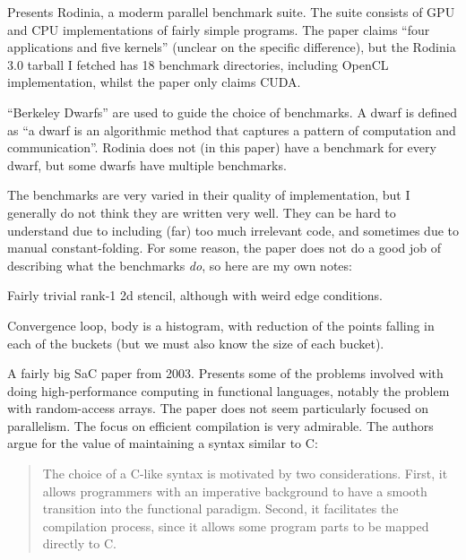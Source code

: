\documentclass[a4paper, oneside, final]{memoir}
\begin{document}
\begin{quote}
\end{quote}

Presents Rodinia, a moderm parallel benchmark suite.  The suite
consists of GPU and CPU implementations of fairly simple programs.
The paper claims ``four applications and five kernels'' (unclear on
the specific difference), but the Rodinia 3.0 tarball I fetched has 18
benchmark directories, including OpenCL implementation, whilst the
paper only claims CUDA.

``Berkeley Dwarfs'' are used to guide the choice of benchmarks.  A
dwarf is defined as ``a dwarf is an algorithmic method that captures a
pattern of computation and communication''.  Rodinia does not (in this
paper) have a benchmark for every dwarf, but some dwarfs have multiple
benchmarks.

The benchmarks are very varied in their quality of implementation, but
I generally do not think they are written very well.  They can be hard
to understand due to including (far) too much irrelevant code, and
sometimes due to manual constant-folding.  For some reason, the paper
does not do a good job of describing what the benchmarks \textit{do},
so here are my own notes:

\begin{description}
\item[HotSpot] Fairly trivial rank-1 2d stencil, although with weird
  edge conditions.
\item[Kmeans] Convergence loop, body is a histogram, with reduction of
  the points falling in each of the buckets (but we must also know the
  size of each bucket).
\item
\end{description}

\begin{quote}
\end{quote}

A fairly big SaC paper from 2003.  Presents some of the problems
involved with doing high-performance computing in functional
languages, notably the problem with random-access arrays.  The paper
does not seem particularly focused on parallelism.  The focus on
efficient compilation is very admirable.  The authors argue for the
value of maintaining a syntax similar to C:

\begin{quote}
  The choice of a C-like syntax is motivated by two
  considerations. First, it allows programmers with an imperative
  background to have a smooth transition into the functional
  paradigm. Second, it facilitates the compilation process, since it
  allows some program parts to be mapped directly to C.
\end{quote}
\end{document}
